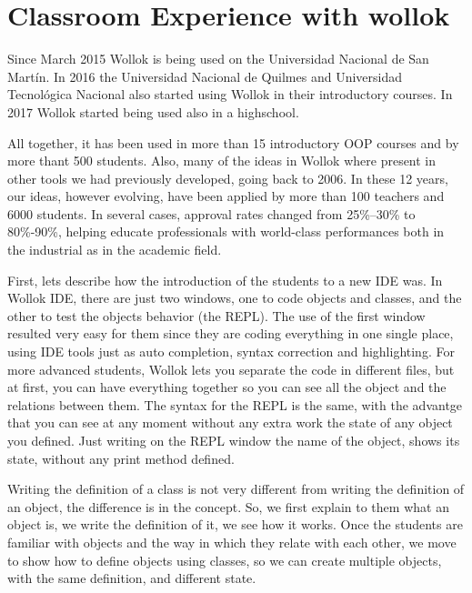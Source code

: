 \section{Classroom Experience with wollok}
\label{experience}

Since March 2015 Wollok is being used on the Universidad Nacional de San Martín. 
In 2016 the Universidad Nacional de Quilmes and Universidad Tecnológica Nacional also started using Wollok in their introductory courses.
In 2017 Wollok started being used also in a highschool. 

All together, it has been used in more than 15 introductory OOP courses and by more thant 500 students.
Also, many of the ideas in Wollok where present in other tools we had previously developed, going back to 2006. In these 12 years, our ideas, however evolving, have been applied by more than 100 teachers and 6000 students. 
In several cases, approval rates changed from 25\%--30\% to 80\%-90\%, 
helping educate professionals with world-class performances both in the industrial as in the academic field. 

\medskip
First, lets describe how the introduction of the students to a new IDE was. 
In Wollok IDE, there are just two windows, one to code objects and classes, and the other to test the objects behavior (the REPL). 
The use of the first window resulted very easy for them since they are coding everything in one single place, using IDE tools just as auto completion, syntax correction and highlighting. 
For more advanced students, Wollok lets you separate the code in different files, but at first, you can have everything together so you can see all the object and the relations between them.
The syntax for the REPL is the same, with the advantge that you can see at any moment without any extra work the state of any object you defined. 
Just writing on the REPL window the name of the object, shows its state, without any print method defined.

Writing the definition of a class is not very different from writing the definition of an object, the difference is in the concept. 
So, we first explain to them what an object is, we write the definition of it, we see how it works. 
Once the students are familiar with objects and the way in which they relate with each other, we move to show how to define objects using classes, so we can create multiple objects, with the same definition, and different state.

